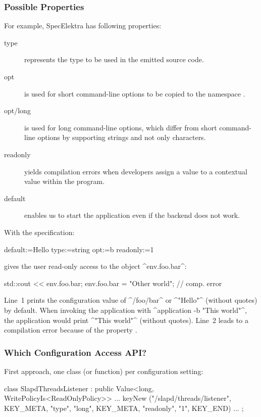 \begin{frame}
	\frametitle{Possible Properties}
	For example, SpecElektra has following properties:
	\begin{description}
	\item[type] represents the type to be used in the emitted source code.
	\item[opt] is used for short command-line options to be copied to the namespace .
	\item[opt/long] is used for long command-line options, which differ from short command-line options by supporting strings and not only characters.
	\item[readonly] yields compilation errors when developers assign a value to a contextual value within the program.
	\item[default] enables us to start the application even if the backend does not work.
	\end{description}
\end{frame}

\begin{frame}[fragile]
	With the specification:
	\par
	\begin{code}
	  default:=Hello
	  type:=string
	  opt:=b
	  readonly:=1
	\end{code}
	\par
	 gives the user read-only access to the object ^env.foo.bar^:
	\par
	\begin{code}[language=Cpp]
	std::cout << env.foo.bar;
	env.foo.bar = "Other world"; // comp. error
	\end{code}
	\par
	\small
	\pause
	Line~1 prints the configuration value of ^/foo/bar^ or ^"Hello"^ (without quotes) by default.
	When invoking the application with ^application -b "This world"^, the application would print ^"This world"^ (without quotes).
	Line~2 leads to a compilation error because of the property .
\end{frame}

\begin{frame}[fragile]
	\frametitle{Which Configuration Access API?}

	First approach, one class (or function) per configuration setting:
	\\[1em]
	\begin{code}[gobble=4,language=Cpp]
	class SlapdThreadsListener : public Value<long,
		WritePolicyIs<ReadOnlyPolicy>> {
		... keyNew ("/slapd/threads/listener",
			    KEY_META, "type", "long",
			    KEY_META, "readonly", "1",
			    KEY_END) ...
	};
	\end{code}
\end{frame}

